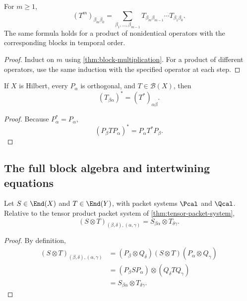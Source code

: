 \begin{corollary}
\label{cor:block-powers}
For $m\geq1$,
\[
(T^m)_{\beta_m\beta_0}
=
\sum_{\beta_1,\ldots,\beta_{m-1}}
T_{\beta_m\beta_{m-1}}
\cdots
T_{\beta_1\beta_0}.
\]
The same formula holds for a product of nonidentical operators with the corresponding blocks in temporal order.
\end{corollary}

\begin{proof}
Induct on $m$ using \cref{thm:block-multiplication}.  For a product of different operators, use the same induction with the specified operator at each step.
\end{proof}

\begin{corollary}
\label{cor:adjoint-reversal}
If $X$ is Hilbert, every $P_\alpha$ is orthogonal, and $T\in\mathcal B(X)$, then
\[
\boxed{(T_{\beta\alpha})^*=(T^*)_{\alpha\beta}.}
\]
\end{corollary}

\begin{proof}
Because $P_\alpha^*=P_\alpha$,
\[
(P_\beta TP_\alpha)^*=P_\alpha T^*P_\beta.
\]
\end{proof}

\subsection{The full block algebra and intertwining equations}

\begin{corollary}
\label{cor:tensor-transfer-blocks}
Let \(S\in\End(X)\) and \(T\in\End(Y)\), with packet systems \(\Pcal\) and \(\Qcal\).  Relative to the tensor product packet system of \cref{thm:tensor-packet-system},
\[
\boxed{
(S\otimes T)_{(\beta,\delta),(\alpha,\gamma)}
=
S_{\beta\alpha}\otimes T_{\delta\gamma}.
}
\]
\end{corollary}

\begin{proof}
By definition,
\begin{align*}
(S\otimes T)_{(\beta,\delta),(\alpha,\gamma)}
&=(P_\beta\otimes Q_\delta)(S\otimes T)(P_\alpha\otimes Q_\gamma)\\
&=(P_\beta SP_\alpha)\otimes(Q_\delta TQ_\gamma)\\
&=S_{\beta\alpha}\otimes T_{\delta\gamma}.
\end{align*}
\end{proof}

